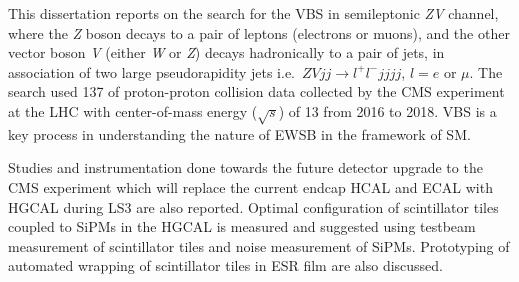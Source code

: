 This dissertation reports on the search for
the \gls{VBS} in semileptonic \textit{ZV} channel,
where the \textit{Z} boson decays to a pair of leptons (electrons or muons),
and the other vector boson \textit{V} (either \textit{W} or \textit{Z})
decays hadronically to a pair of jets, in association of two large pseudorapidity jets
i.e.~\( \textit{ZV}jj \rightarrow l^{+}l^-jjjj \), \( l=e \) or \( \mu \).
The search used 137 \fbinv{} of proton-proton collision data collected by
the \gls{CMS} experiment at the \gls{LHC} with
center-of-mass energy (\( \sqrt{s} \)) of 13 \TeV{} from 2016 to 2018.
\gls{VBS} is a key process in understanding the nature of \gls{EWSB} in
the framework of \gls{SM}.

Studies and instrumentation done towards the future detector
upgrade to the \gls{CMS} experiment which will replace
the current endcap \gls{HCAL} and \gls{ECAL} with \gls{HGCAL}
during \gls{LS3} are also reported.
Optimal configuration
of scintillator tiles coupled to \glspl{SiPM}
in the \gls{HGCAL} is measured and suggested using testbeam measurement of
scintillator tiles and noise measurement of \glspl{SiPM}.
Prototyping of automated wrapping of scintillator tiles in \gls{ESR} film
are also discussed.
